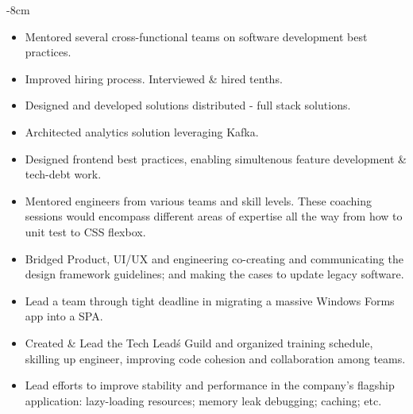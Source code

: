 \documentclass[10pt,a4paper]{altacv}
\begin{document}

\begin{adjustwidth}{}{-8cm}
\makecvheader
\end{adjustwidth}


\begin{itemize}
\item Mentored several cross-functional teams on software development best practices.
\item Improved hiring process. Interviewed \& hired tenths.
\item Designed and developed solutions distributed - full stack solutions.
\item Architected analytics solution leveraging Kafka.
\item Designed frontend best practices, enabling simultenous feature development \& tech-debt work.
\end{itemize}
\divider

\begin{itemize}
\item Mentored engineers from various teams and skill levels. These coaching sessions would encompass different areas of expertise all the way from how to unit test to CSS flexbox.
\item Bridged Product, UI/UX and engineering co-creating and communicating the design framework guidelines; and making the cases to update legacy software.
\item Lead a team through tight deadline in migrating a massive Windows Forms app into a SPA.
\item Created \& Lead the Tech Lead\'s Guild and organized training schedule, skilling up engineer, improving code cohesion and collaboration among teams.
\item Lead efforts to improve stability and performance in the company's flagship application: lazy-loading resources; memory leak debugging; caching; etc.
\end{itemize}
\divider
\end{document}
